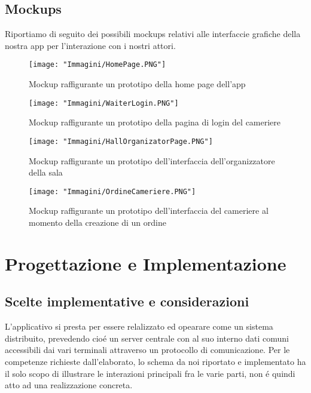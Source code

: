 \documentclass{article}
\begin{document}

\subsection{Mockups}
Riportiamo di seguito dei possibili mockups relativi alle interfaccie grafiche della nostra app per l'interazione con i nostri attori.

\begin{figure}[!h]
\centering
\texttt{[image: "Immagini/HomePage.PNG"]}
\caption{Mockup raffigurante un prototipo della home page dell'app}
\end{figure}

\newpage

\begin{figure}[!h]
\centering
\texttt{[image: "Immagini/WaiterLogin.PNG"]}
\caption{Mockup raffigurante un prototipo della pagina di login del cameriere}
\end{figure}

\begin{figure}[!h]
\centering
\texttt{[image: "Immagini/HallOrganizatorPage.PNG"]}
\caption{Mockup raffigurante un prototipo dell'interfaccia dell'organizzatore della sala}
\end{figure}

\newpage

\begin{figure}[!h]
\centering
\texttt{[image: "Immagini/OrdineCameriere.PNG"]}
\caption{Mockup raffigurante un prototipo dell'interfaccia del cameriere al momento della creazione di un ordine}
\end{figure}

\section{Progettazione e Implementazione}
\subsection{Scelte implementative e considerazioni}
L'applicativo si presta per essere relalizzato ed opearare come un sistema distribuito, prevedendo cio\'e un server centrale con al suo interno dati comuni accessibili dai vari terminali attraverso un protocollo di comunicazione. Per le competenze richieste dall'elaborato, lo schema da noi riportato e implementato ha il solo scopo di illustrare le interazioni principali fra le varie parti, non \'e quindi atto ad una realizzazione concreta.  
\end{document}
